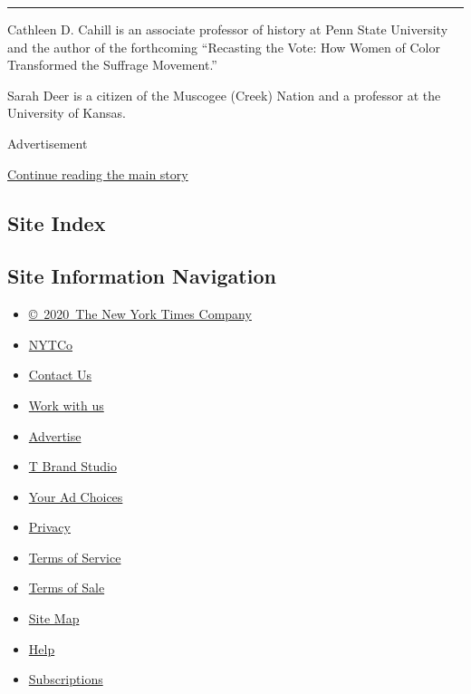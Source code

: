 \begin{center}\rule{0.5\linewidth}{\linethickness}\end{center}

Cathleen D. Cahill is an associate professor of history at Penn State
University and the author of the forthcoming ``Recasting the Vote: How
Women of Color Transformed the Suffrage Movement.''

Sarah Deer is a citizen of the Muscogee (Creek) Nation and a professor
at the University of Kansas.

Advertisement

\protect\hyperlink{after-bottom}{Continue reading the main story}

\hypertarget{site-index}{%
\subsection{Site Index}\label{site-index}}

\hypertarget{site-information-navigation}{%
\subsection{Site Information
Navigation}\label{site-information-navigation}}

\begin{itemize}
\tightlist
\item
  \href{https://help.nytimes3xbfgragh.onion/hc/en-us/articles/115014792127-Copyright-notice}{©~2020~The
  New York Times Company}
\end{itemize}

\begin{itemize}
\tightlist
\item
  \href{https://www.nytco.com/}{NYTCo}
\item
  \href{https://help.nytimes3xbfgragh.onion/hc/en-us/articles/115015385887-Contact-Us}{Contact
  Us}
\item
  \href{https://www.nytco.com/careers/}{Work with us}
\item
  \href{https://nytmediakit.com/}{Advertise}
\item
  \href{http://www.tbrandstudio.com/}{T Brand Studio}
\item
  \href{https://www.nytimes3xbfgragh.onion/privacy/cookie-policy\#how-do-i-manage-trackers}{Your
  Ad Choices}
\item
  \href{https://www.nytimes3xbfgragh.onion/privacy}{Privacy}
\item
  \href{https://help.nytimes3xbfgragh.onion/hc/en-us/articles/115014893428-Terms-of-service}{Terms
  of Service}
\item
  \href{https://help.nytimes3xbfgragh.onion/hc/en-us/articles/115014893968-Terms-of-sale}{Terms
  of Sale}
\item
  \href{https://spiderbites.nytimes3xbfgragh.onion}{Site Map}
\item
  \href{https://help.nytimes3xbfgragh.onion/hc/en-us}{Help}
\item
  \href{https://www.nytimes3xbfgragh.onion/subscription?campaignId=37WXW}{Subscriptions}
\end{itemize}
